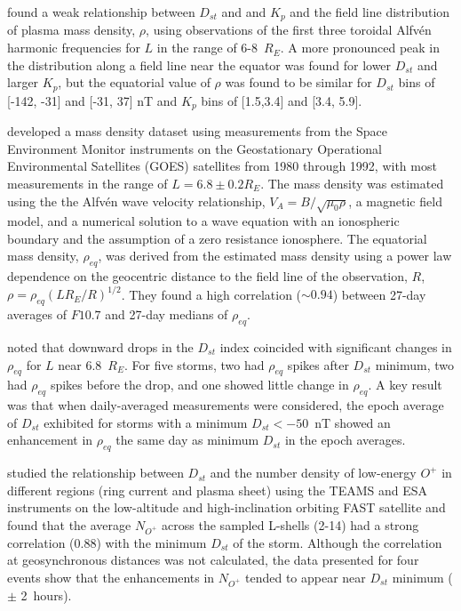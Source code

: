 \documentclass[12pt]{article}
\begin{document}
\cite{Denton2006} found a weak relationship between $D_{st}$ and and $K_p$ and the field line distribution of plasma mass density, $\rho$, using observations of the first three toroidal Alfv\'en harmonic frequencies for $L$ in the range of 6-8~$R_E$.  A more pronounced peak in the distribution along a field line near the equator was found for lower $D_{st}$ and larger $K_p$, but the equatorial value of $\rho$ was found to be similar for $D_{st}$ bins of [-142, -31] and [-31, 37] nT and $K_p$ bins of [1.5,3.4] and [3.4, 5.9].

\cite{Takahashi2010} developed a mass density dataset using measurements from the Space Environment Monitor instruments on the Geostationary Operational Environmental Satellites (GOES) satellites from 1980 through 1992, with most measurements in the range of $L=6.8\pm0.2 R_E$. The mass density was estimated using the the Alfv\'en wave velocity relationship, $V_A=B/\sqrt{\mu_0\rho}$, a magnetic field model, and a numerical solution to a wave equation with an ionospheric boundary and the assumption of a zero resistance ionosphere.  The equatorial mass density, $\rho_{eq}$, was derived from the estimated mass density using a power law dependence on the geocentric distance to the field line of the observation, $R$, $\rho=\rho_{eq}(LR_E/R)^{1/2}$.  They found a high correlation ($\sim 0.94$) between 27-day averages of $F10.7$ and 27-day medians of $\rho_{eq}$.

\cite{Takahashi2010} noted that downward drops in the $D_{st}$ index coincided with significant changes in $\rho_{eq}$ for $L$ near 6.8~$R_E$. For five storms, two had $\rho_{eq}$ spikes after $D_{st}$ minimum, two had $\rho_{eq}$ spikes before the drop, and one showed little change in $\rho_{eq}$.  A key result was that when daily-averaged measurements were considered, the epoch average of $D_{st}$ exhibited for storms with a minimum $D_{st} < -50$~nT showed an enhancement in $\rho_{eq}$ the same day as minimum $D_{st}$ in the epoch averages.

\cite{Yao2008} studied the relationship between $D_{st}$ and the number density of low-energy $O^+$ in different regions (ring current and plasma sheet) using the TEAMS and ESA instruments on the low-altitude and high-inclination orbiting FAST satellite and found that the average $N_{O^+}$ across the sampled L-shells (2-14) had a strong correlation (0.88) with the minimum $D_{st}$ of the storm.  Although the correlation at geosynchronous distances was not calculated, the data presented for four events show that the enhancements in $N_{O^+}$ tended to appear near $D_{st}$ minimum ($\pm$ 2~hours).
\end{document}
